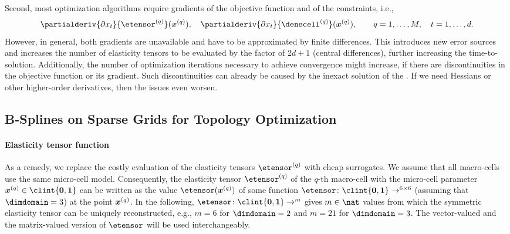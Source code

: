 Second, most optimization algorithms require gradients of the
objective function and of the constraints, i.e.,%
\begin{equation}
  \partialderiv{\partialdiff{} x_t}{\etensor^{(q)}}(\*x^{(q)}),\quad
  \partialderiv{\partialdiff{} x_t}{\denscell^{(q)}}(\*x^{(q)}),\qquad
  q = 1, \dotsc, M,\quad
  t = 1, \dotsc, d.
\end{equation}
However, in general, both gradients are unavailable and
have to be approximated by finite differences.
This introduces new error sources and
increases the number of elasticity tensors to be evaluated
by the factor of $2d + 1$ (central differences),
further increasing the time-to-solution.
Additionally, the number of optimization iterations necessary to
achieve convergence might increase,
if there are discontinuities in the objective function
or its gradient.
Such discontinuities can already be caused by the inexact solution of the \fem.
If we need Hessians or other higher-order derivatives,
then the issues even worsen.



\subsection{B-Splines on Sparse Grids for Topology Optimization}
\label{sec:622BSplines}

\paragraph{Elasticity tensor function}

As a remedy, we replace the costly evaluation of the
elasticity tensors $\etensor^{(q)}$ with cheap surrogates.
We assume that all macro-cells use the same micro-cell model.
Consequently, the elasticity tensor $\etensor^{(q)}$ of the $q$-th macro-cell
with the micro-cell parameter $\*x^{(q)} \in \clint{\*0, \*1}$
can be written as the value $\etensor(\*x^{(q)})$ of some function
$\etensor\colon \clint{\*0, \*1} \to \real^{6 \times 6}$
(assuming that $\dimdomain = 3$) at the point ${\boldsymbol{x}}^{(q)}$.
In the following,
$\etensor\colon \clint{\*0, \*1} \to \real^m$
gives $m \in \nat$ values from which the symmetric elasticity tensor
can be uniquely reconstructed,
e.g., $m = 6$ for $\dimdomain = 2$ and $m = 21$ for $\dimdomain = 3$.
The vector-valued and the matrix-valued version of $\etensor$
will be used interchangeably.

